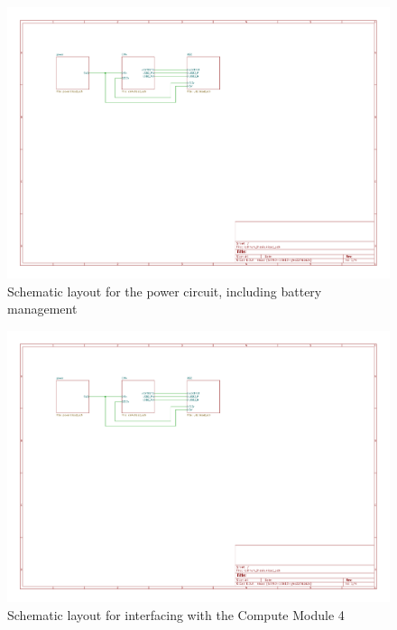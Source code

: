 \begin{figure}[h]
  \centering
  \includegraphics[height=1\textwidth,angle=90,page=2]{Figures/kicad/lathrum_thesis_schematic.pdf}
  \captionsetup{width=1\linewidth}
  \caption[Power Schematic]{Schematic layout for the power circuit, including battery management}
  \label{app:pcb_schematic_battery}
\end{figure}

\begin{figure}[h]
  \centering
  \includegraphics[height=1\textwidth,angle=90,page=3]{Figures/kicad/lathrum_thesis_schematic.pdf}
  \captionsetup{width=1\linewidth}
  \caption[CM4 Schematic]{Schematic layout for interfacing with the Compute Module 4}
  \label{app:pcb_schematic_cm4}
\end{figure}

